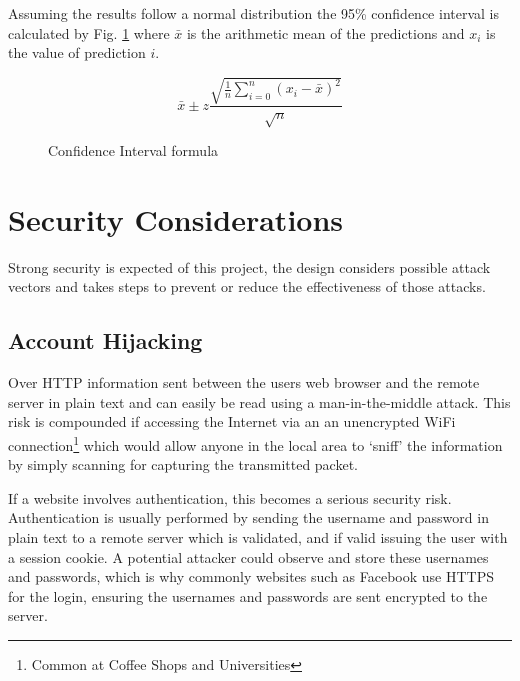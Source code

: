 Assuming the results follow a normal distribution the 95\% confidence interval is calculated by Fig. \ref{fig:confidencelevel} where $\bar{x}$ is the arithmetic mean of the predictions and $x_i$ is the value of prediction $i$.

\begin{figure}[h]
    \centering
    \[
        \bar{x} \pm z \frac{
                        \sqrt{
                            \frac{1}{n}
                            \sum\limits_{i=0}^{n}{(x_i - \bar{x})^2}
                        }
                       }{\sqrt{n}}
    \]
    \caption{Confidence Interval formula}
    \label{fig:confidencelevel}
\end{figure}

\section{Security Considerations}
Strong security is expected of this project, the design considers possible attack vectors and takes steps to prevent or reduce the effectiveness of those attacks.

\subsection{Account Hijacking}

Over HTTP information sent between the users web browser and the remote server in plain text and can easily be read using a man-in-the-middle attack. This risk is compounded if accessing the Internet via an an unencrypted WiFi connection\footnote{Common at Coffee Shops and Universities} which would allow anyone in the local area to `sniff' the information by simply scanning for capturing the transmitted packet.

If a website involves authentication, this becomes a serious security risk. Authentication is usually performed by sending the username and password in plain text to a remote server which is validated, and if valid issuing the user with a session cookie.
%
A potential attacker could observe and store these usernames and passwords, which is why commonly websites such as Facebook use HTTPS for the login, ensuring the usernames and passwords are sent encrypted to the server.

